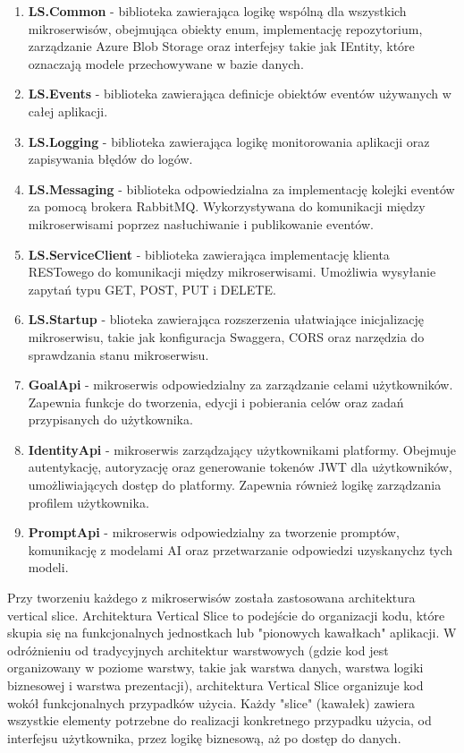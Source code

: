 \begin{enumerate}
\item {\bf LS.Common} - biblioteka zawierająca logikę wspólną dla wszystkich mikroserwisów, obejmująca obiekty enum, implementację repozytorium, zarządzanie Azure Blob Storage oraz interfejsy takie jak IEntity, które oznaczają modele przechowywane w bazie danych.
\item {\bf LS.Events} - biblioteka zawierająca definicje obiektów eventów używanych w całej aplikacji.
\item {\bf LS.Logging} - biblioteka zawierająca logikę monitorowania aplikacji oraz zapisywania błędów do logów.
\item {\bf LS.Messaging} - biblioteka odpowiedzialna za implementację kolejki eventów za pomocą brokera RabbitMQ. Wykorzystywana do komunikacji między mikroserwisami poprzez nasłuchiwanie i publikowanie eventów.
\item {\bf LS.ServiceClient} - biblioteka zawierająca implementację klienta RESTowego do komunikacji między mikroserwisami. Umożliwia wysyłanie zapytań typu GET, POST, PUT i DELETE.
\item {\bf LS.Startup} - blioteka zawierająca rozszerzenia ułatwiające inicjalizację mikroserwisu, takie jak konfiguracja Swaggera, CORS oraz narzędzia do sprawdzania stanu mikroserwisu.
\item {\bf GoalApi} - mikroserwis odpowiedzialny za zarządzanie celami użytkowników. Zapewnia funkcje do tworzenia, edycji i pobierania celów oraz zadań przypisanych do użytkownika.
\item {\bf IdentityApi} - mikroserwis zarządzający użytkownikami platformy. Obejmuje autentykację, autoryzację oraz generowanie tokenów JWT dla użytkowników, umożliwiających dostęp do platformy. Zapewnia również logikę zarządzania profilem użytkownika.
\item {\bf PromptApi} - mikroserwis odpowiedzialny za tworzenie promptów, komunikację z modelami AI oraz przetwarzanie odpowiedzi uzyskanych\linebreak z tych modeli.
\end{enumerate}

Przy tworzeniu każdego z mikroserwisów została zastosowana architektura vertical slice. Architektura Vertical Slice to podejście do organizacji kodu, które skupia się na funkcjonalnych jednostkach lub "pionowych kawałkach" aplikacji. W odróżnieniu od tradycyjnych architektur warstwowych (gdzie kod jest organizowany w poziome warstwy, takie jak warstwa danych, warstwa logiki biznesowej i warstwa prezentacji), architektura Vertical Slice organizuje kod wokół funkcjonalnych przypadków użycia. Każdy "slice" (kawałek) zawiera wszystkie elementy potrzebne do realizacji konkretnego przypadku użycia, od interfejsu użytkownika, przez logikę biznesową, aż po dostęp do danych.

